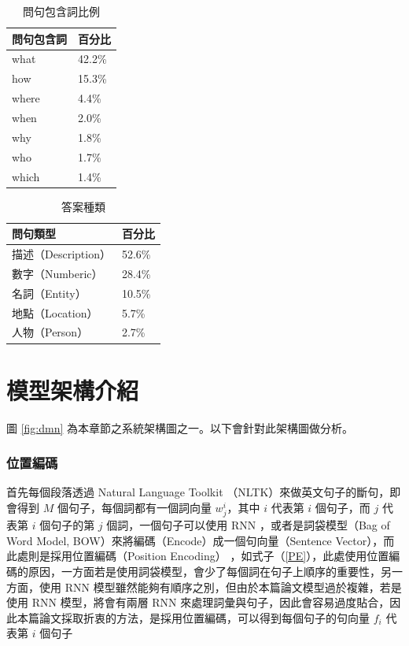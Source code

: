 \begin{table}
    \caption{問句包含詞比例}
    \label{table:query_percentage}
    \centering
    \begin{tabular}[h]{|l|l|}
        \hline
        問句包含詞  &百分比\\
        \hline
        what        &42.2\%\\
        \hline
        how         &15.3\%\\
        \hline
        where       &4.4\%\\
        \hline
        when        &2.0\%\\
        \hline
        why         &1.8\%\\
        \hline
        who         &1.7\%\\
        \hline
        which       &1.4\%\\
        \hline
    \end{tabular}
\end{table}
\begin{table}
    \caption{答案種類}
    \label{table:query_type}
    \centering
    \begin{tabular}{|l|l|}
        \hline
        問句類型            &百分比\\
        \hline
        描述（Description） &52.6\%\\
        \hline
        數字（Numberic）    &28.4\%\\
        \hline
        名詞（Entity）      &10.5\%\\
        \hline
        地點（Location）    &5.7\%\\
        \hline
        人物（Person）      &2.7\%\\
        \hline
    \end{tabular}
\end{table}

\section{模型架構介紹}
圖 \ref{fig:dmn} 為本章節之系統架構圖之一。以下會針對此架構圖做分析。

\subsubsection{位置編碼}
首先每個段落透過 Natural Language Toolkit （NLTK）來做英文句子的斷句，即會得到 $M$ 個句子，每個詞都有一個詞向量 $w_j^i$，其中 $i$ 代表第 $i$ 個句子，而 $j$ 代表第 $i$ 個句子的第 $j$ 個詞，一個句子可以使用 RNN ，或者是詞袋模型（Bag of Word Model, BOW）來將編碼（Encode）成一個句向量（Sentence Vector），而此處則是採用位置編碼（Position Encoding）\cite{sukhbaatar2015end}  ，如式子（\ref{PE}），此處使用位置編碼的原因，一方面若是使用詞袋模型，會少了每個詞在句子上順序的重要性，另一方面，使用 RNN 模型雖然能夠有順序之別，但由於本篇論文模型過於複雜，若是使用 RNN 模型，將會有兩層 RNN 來處理詞彙與句子，因此會容易過度貼合，因此本篇論文採取折衷的方法，是採用位置編碼，可以得到每個句子的句向量 $f_i$ 代表第 $i$ 個句子

